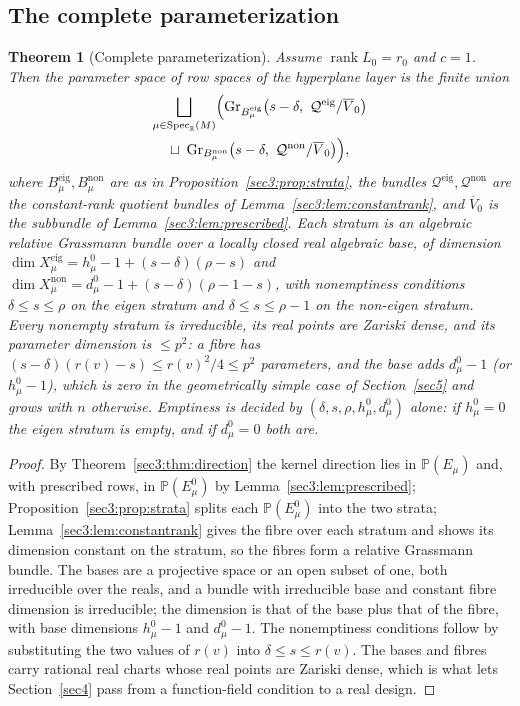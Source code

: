 \documentclass[journal]{IEEEtran}
\theoremstyle{plainn}
\newtheorem{thm}{Theorem}
\theoremstyle{remark}
\newcommand{\rank}{\operatorname{rank}}
\newcommand{\Gr}{\operatorname{Gr}}
\begin{document}
\subsection{The complete parameterization}
\label{sec3:sub:param}
\begin{thm}[Complete parameterization]
\label{sec3:thm:param}
\label{sec3:rem:empty}
\label{sec3:rem:dimension}
\label{sec3:rem:realpoints}
Assume $\rank L_0=r_0$ and $c=1$. Then the parameter space of row spaces of the hyperplane layer is
the finite union
\begin{gather*}
\bigsqcup_{\mu\in\operatorname{Spec}_{\mathbb{R}}(M)}
\Bigl(
\Gr_{B_\mu^{\mathrm{eig}}}\bigl(s-\delta,\ \mathcal{Q}^{\mathrm{eig}}/\overline{V}_0\bigr)
\\
\sqcup\ \Gr_{B_\mu^{\mathrm{non}}}\bigl(s-\delta,\ \mathcal{Q}^{\mathrm{non}}/\overline{V}_0\bigr)
\Bigr),
\end{gather*}
where $B_\mu^{\mathrm{eig}},B_\mu^{\mathrm{non}}$ are as in Proposition~\ref{sec3:prop:strata}, the
bundles $\mathcal{Q}^{\mathrm{eig}},\mathcal{Q}^{\mathrm{non}}$ are the constant-rank quotient bundles
of Lemma~\ref{sec3:lem:constantrank}, and $\overline{V}_0$ is the subbundle of
Lemma~\ref{sec3:lem:prescribed}. Each stratum is an \emph{algebraic relative Grassmann bundle over a
locally closed real algebraic base}, of dimension
$\dim X_\mu^{\mathrm{eig}}=h_\mu^0-1+(s-\delta)(\rho-s)$ and
$\dim X_\mu^{\mathrm{non}}=d_\mu^0-1+(s-\delta)(\rho-1-s)$, with nonemptiness conditions
$\delta\le s\le\rho$ on the eigen stratum and $\delta\le s\le\rho-1$ on the non-eigen stratum. Every
nonempty stratum is irreducible, its real points are Zariski dense, and its parameter dimension is
$\le p^2$: a fibre has $(s-\delta)(r(v)-s)\le r(v)^2/4\le p^2$ parameters, and the base adds $d_\mu^0-1$
(or $h_\mu^0-1$), which is zero in the geometrically simple case of Section~\ref{sec5} and grows with
$n$ otherwise. Emptiness is decided by $(\delta,s,\rho,h_\mu^0,d_\mu^0)$ alone: if $h_\mu^0=0$ the eigen
stratum is empty, and if $d_\mu^0=0$ both are.
\end{thm}
\begin{proof}
By Theorem~\ref{sec3:thm:direction} the kernel direction lies in $\mathbb{P}(E_\mu)$ and, with
prescribed rows, in $\mathbb{P}(E_\mu^0)$ by Lemma~\ref{sec3:lem:prescribed};
Proposition~\ref{sec3:prop:strata} splits each $\mathbb{P}(E_\mu^0)$ into the two strata;
Lemma~\ref{sec3:lem:constantrank} gives the fibre over each stratum and shows its dimension constant on
the stratum, so the fibres form a relative Grassmann bundle. The bases are a projective space or an open
subset of one, both irreducible over the reals, and a bundle with irreducible base and constant fibre
dimension is irreducible; the dimension is that of the base plus that of the fibre, with base
dimensions $h_\mu^0-1$ and $d_\mu^0-1$. The nonemptiness conditions follow by substituting the two
values of $r(v)$ into $\delta\le s\le r(v)$. The bases and fibres carry rational real charts whose real
points are Zariski dense, which is what lets Section~\ref{sec4} pass from a function-field condition to
a real design.
\end{proof}
\end{document}
